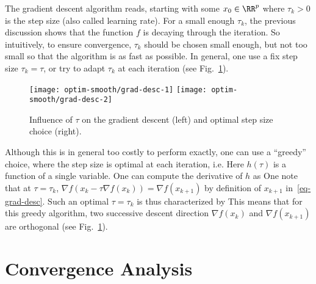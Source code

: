 The gradient descent algorithm reads, starting with some $x_0 \in \RR^p$
where $\tau_k>0$ is the step size (also called learning rate). For a small enough $\tau_k$, the previous discussion shows that the function $f$ is decaying through the iteration. So intuitively, to ensure convergence, $\tau_k$ should be chosen small enough, but not too small so that the algorithm is as fast as possible.
%
In general, one use a fix step size $\tau_k=\tau$, or try to adapt $\tau_k$ at each iteration (see Fig.~\ref{fig-gradesc}). 


\begin{figure}
\centering
\texttt{[image: optim-smooth/grad-desc-1]} \quad
\texttt{[image: optim-smooth/grad-desc-2]} 
\caption{\label{fig-gradesc}
Influence of $\tau$ on the gradient descent (left) and optimal step size choice (right).
}
\end{figure}


\begin{rem}
Although this is in general too costly to perform exactly, one can use a ``greedy'' choice, where the step size is optimal at each iteration, i.e. 
Here $h(\tau)$ is a function of a single variable. One can compute the derivative of $h$ as
One note that at $\tau=\tau_k$, $\nabla f(x_k-\tau \nabla f(x_k))=\nabla f(x_{k+1})$ by definition of $x_{k+1}$ in~\eqref{eq-grad-desc}. 
%
Such an optimal $\tau=\tau_k$ is thus characterized by
This means that for this greedy algorithm, two successive descent direction $\nabla f(x_k)$ and $\nabla f(x_{k+1})$ are orthogonal (see Fig.~\ref{fig-gradesc}).
\end{rem}




\section{Convergence Analysis}


